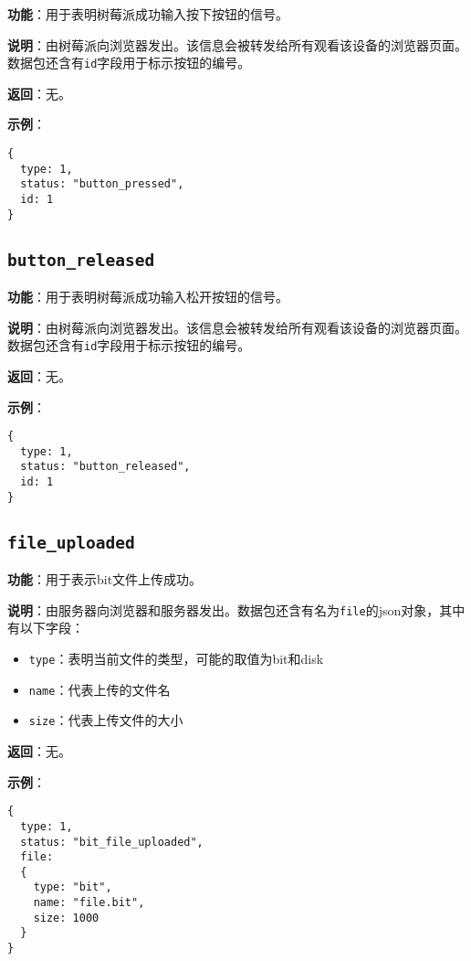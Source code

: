 \documentclass{article}
\begin{document}
\noindent\textbf{功能}：用于表明树莓派成功输入按下按钮的信号。

\noindent\textbf{说明}：由树莓派向浏览器发出。该信息会被转发给所有观看该设备的浏览器页面。数据包还含有\texttt{id}字段用于标示按钮的编号。

\noindent\textbf{返回}：无。

\noindent\textbf{示例}：

\begin{lstlisting}[style=json]
{
  type: 1,
  status: "button_pressed",
  id: 1
}
\end{lstlisting}

\subsection{\texttt{button\_released}}
\label{status:button_released}

\noindent\textbf{功能}：用于表明树莓派成功输入松开按钮的信号。

\noindent\textbf{说明}：由树莓派向浏览器发出。该信息会被转发给所有观看该设备的浏览器页面。数据包还含有\texttt{id}字段用于标示按钮的编号。

\noindent\textbf{返回}：无。

\noindent\textbf{示例}：

\begin{lstlisting}[style=json]
{
  type: 1,
  status: "button_released",
  id: 1
}
\end{lstlisting}

\subsection{\texttt{file\_uploaded}}
\label{status:file_uploaded}

\noindent\textbf{功能}：用于表示bit文件上传成功。

\noindent\textbf{说明}：由服务器向浏览器和服务器发出。数据包还含有名为\texttt{file}的json对象，其中有以下字段：
\begin{itemize}
\item \texttt{type}：表明当前文件的类型，可能的取值为bit和disk
\item \texttt{name}：代表上传的文件名
\item \texttt{size}：代表上传文件的大小
\end{itemize}

\noindent\textbf{返回}：无。

\noindent\textbf{示例}：

\begin{lstlisting}[style=json]
{
  type: 1,
  status: "bit_file_uploaded",
  file: 
  {
    type: "bit",
    name: "file.bit",
    size: 1000
  }
}
\end{lstlisting}
\end{document}
